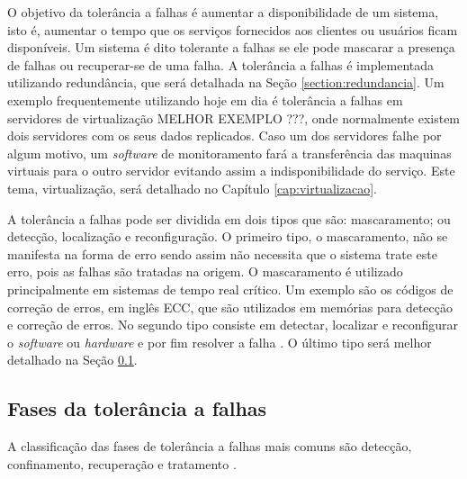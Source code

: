 O objetivo da tolerância a falhas é aumentar a disponibilidade de um sistema, isto é, aumentar o tempo que os serviços fornecidos aos 
clientes ou usuários ficam disponíveis. Um sistema é dito tolerante a falhas se ele pode mascarar a presença de falhas ou recuperar-se 
de uma falha. A tolerância a falhas é implementada utilizando redundância, que será detalhada na Seção \ref{section:redundancia}. 
Um exemplo frequentemente utilizando hoje em dia é tolerância a falhas em servidores de virtualização MELHOR EXEMPLO ???, onde normalmente
existem dois servidores com os seus dados replicados. Caso um dos servidores falhe por algum motivo, um \textit{software} de monitoramento
fará a transferência das maquinas virtuais para o outro servidor evitando assim a indisponibilidade do serviço. Este tema, virtualização, 
será detalhado no Capítulo \ref{cap:virtualizacao}.

A tolerância a falhas pode ser dividida em dois tipos que são: mascaramento; ou detecção, localização e reconfiguração.
O primeiro tipo, o mascaramento, não se manifesta na forma de erro sendo assim não necessita que o sistema trate este erro,
pois as falhas são tratadas na origem. O mascaramento é utilizado principalmente em sistemas de tempo real crítico. 
Um exemplo são os códigos de correção de erros, em inglês \ac{ECC}, que são utilizados em memórias para detecção e correção de erros.
No segundo tipo consiste em detectar, localizar e reconfigurar o \textit{software} ou \textit{hardware} e por fim resolver a 
falha \cite{weber2002}. O último tipo será melhor detalhado na Seção \ref{section:fasestolerancia}.

\subsection{Fases da tolerância a falhas}
\label{section:fasestolerancia}

A classificação das fases de tolerância a falhas mais comuns são detecção, confinamento, recuperação e tratamento \cite{weber2002}.


